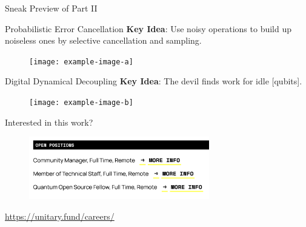 \documentclass[11pt,aspectratio=1610,xcolor=dvipsnames]{beamer}
\begin{document}
\begin{frame}{Sneak Preview of Part II}
	\begin{exampleblock}{Probabilistic Error Cancellation}
		\textbf{Key Idea}: Use noisy operations to build up noiseless ones by selective cancellation and sampling.
	\end{exampleblock}
	\begin{figure}[h]
		\centering
		\texttt{[image: example-image-a]}
	\end{figure}

	\begin{exampleblock}{Digital Dynamical Decoupling}
		\textbf{Key Idea}: The devil finds work for idle [qubits].
	\end{exampleblock}
	\begin{figure}[h]
		\centering
		\texttt{[image: example-image-b]}
	\end{figure}
\end{frame}

\begin{frame}{Interested in this work?}
	\begin{figure}[h]
		\centering
		\includegraphics[width=0.7\textwidth]{jobs}
	\end{figure}
	\begin{center}

		\url{https://unitary.fund/careers/}
	\end{center}
\end{frame}
\end{document}
